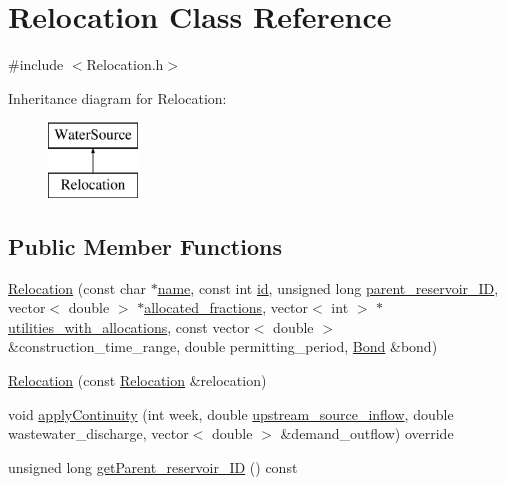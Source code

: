 \hypertarget{classRelocation}{}\section{Relocation Class Reference}
\label{classRelocation}


{\ttfamily \#include $<$Relocation.\+h$>$}

Inheritance diagram for Relocation\+:\begin{figure}[H]
\begin{center}
\leavevmode
\includegraphics[height=2.000000cm]{classRelocation}
\end{center}
\end{figure}
\subsection*{Public Member Functions}
\begin{DoxyCompactItemize}
\item 
\mbox{\hyperlink{classRelocation_abeada1f0c797d8992c1e6a200b571574_abeada1f0c797d8992c1e6a200b571574}{Relocation}} (const char $\ast$\mbox{\hyperlink{classWaterSource_a846ea74c5b453d014f594d41fee8c765_a846ea74c5b453d014f594d41fee8c765}{name}}, const int \mbox{\hyperlink{classWaterSource_a6eafe5dfefd317877d1244e8a7c6e742_a6eafe5dfefd317877d1244e8a7c6e742}{id}}, unsigned long \mbox{\hyperlink{classRelocation_a61282254064f00641aaec667a7eb0652_a61282254064f00641aaec667a7eb0652}{parent\+\_\+reservoir\+\_\+\+ID}}, vector$<$ double $>$ $\ast$\mbox{\hyperlink{classWaterSource_a2f6655a80c4847fe039987255d9d998c_a2f6655a80c4847fe039987255d9d998c}{allocated\+\_\+fractions}}, vector$<$ int $>$ $\ast$\mbox{\hyperlink{classRelocation_ae426f390487b6b67f19bfbf556c922c2_ae426f390487b6b67f19bfbf556c922c2}{utilities\+\_\+with\+\_\+allocations}}, const vector$<$ double $>$ \&construction\+\_\+time\+\_\+range, double permitting\+\_\+period, \mbox{\hyperlink{classBond}{Bond}} \&bond)
\item 
\mbox{\hyperlink{classRelocation_a51eeb6a7d2b07940c2688b9b550145f0_a51eeb6a7d2b07940c2688b9b550145f0}{Relocation}} (const \mbox{\hyperlink{classRelocation}{Relocation}} \&relocation)
\item 
void \mbox{\hyperlink{classRelocation_af5c795c7b331b86b31c8bfa2ef9b6fe5_af5c795c7b331b86b31c8bfa2ef9b6fe5}{apply\+Continuity}} (int week, double \mbox{\hyperlink{classWaterSource_a7a69b2e9b6030f1035e6cf44d2918ee5_a7a69b2e9b6030f1035e6cf44d2918ee5}{upstream\+\_\+source\+\_\+inflow}}, double wastewater\+\_\+discharge, vector$<$ double $>$ \&demand\+\_\+outflow) override
\item 
unsigned long \mbox{\hyperlink{classRelocation_ae04b94d64c0ffd9a14dcdafdea551988_ae04b94d64c0ffd9a14dcdafdea551988}{get\+Parent\+\_\+reservoir\+\_\+\+ID}} () const
\end{DoxyCompactItemize}
